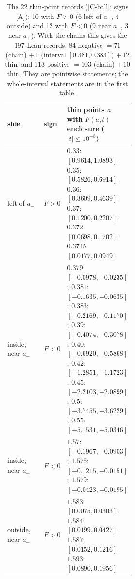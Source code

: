 \documentclass[10pt]{article}
\newcommand{\tier}[1]{\textsf{[#1]}}
\newcommand{\tA}{\tier{A}}
\newcommand{\tCb}{\textcolor{blue!60!black}{\textsf{[C-ball]}}}
\renewcommand{\_}{\textunderscore\penalty0\hspace{0pt}}
\begin{document}
\begin{table}[h]\centering\small
\begin{tabular}{@{}llp{0.52\linewidth}@{}}\toprule
side & sign & thin points $a$ with $F(a,t)$ enclosure ($|t|\le10^{-8}$)\\\midrule
left of $a_-$ & $F>0$ & $0.33$: $[0.9614,1.0893]$; $0.35$: $[0.5826,0.6914]$; $0.36$: $[0.3609,0.4639]$; $0.37$: $[0.1200,0.2207]$; $0.372$: $[0.0698,0.1702]$; $0.3745$: $[0.0177,0.0949]$\\
inside, near $a_-$ & $F<0$ & $0.379$: $[-0.0978,-0.0235]$; $0.381$: $[-0.1635,-0.0635]$; $0.383$: $[-0.2169,-0.1170]$; $0.39$: $[-0.4074,-0.3078]$; $0.40$: $[-0.6920,-0.5868]$; $0.42$: $[-1.2851,-1.1723]$; $0.45$: $[-2.2103,-2.0899]$; $0.5$: $[-3.7455,-3.6229]$; $0.55$: $[-5.1531,-5.0346]$\\
inside, near $a_+$ & $F<0$ & $1.57$: $[-0.1967,-0.0903]$; $1.576$: $[-0.1215,-0.0151]$; $1.579$: $[-0.0423,-0.0195]$\\
outside, near $a_+$ & $F>0$ & $1.583$: $[0.0075,0.0303]$; $1.584$: $[0.0199,0.0427]$; $1.587$: $[0.0152,0.1216]$; $1.593$: $[0.0890,0.1956]$\\\bottomrule
\end{tabular}
\caption{The 22 thin-point records (\tCb; signs \tA): 10 with $F>0$ (6 left of $a_-$, 4 outside) and 12 with $F<0$ (9 near $a_-$, 3 near $a_+$). With the chains this gives the 197 Lean records: 84 negative $=71$ (chain) $+\,1$ (interval $[0.381,0.383]$) $+\,12$ thin, and 113 positive $=103$ (chain) $+\,10$ thin. They are pointwise statements; the whole-interval statements are in the first table.}
\end{table}
\end{document}
